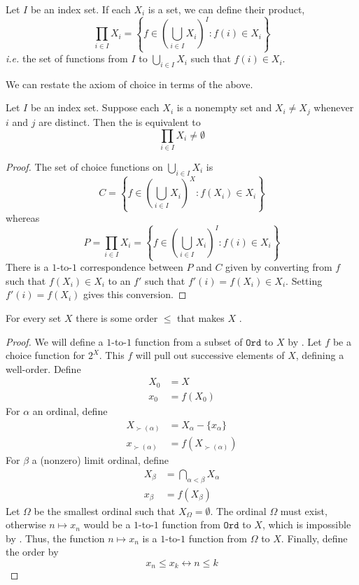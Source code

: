 \documentclass{scrbook}
\renewcommand{\iff}{\leftrightarrow}
\newcommand{\ie}{\emph{i.e.}\xspace}
\newcommand{\ord}{\mathtt{Ord}}
\begin{document}
\begin{defn}
  Let $I$ be an index set. If each $X_i$ is a set, we can define their product,
  \[
  \prod_{i\in I} X_i=\left\{f\in\left(\bigcup_{i\in I} X_i\right)^I: f(i)\in X_i\right\}
  \]
  \ie the set of functions from $I$ to $\bigcup_{i\in I} X_i$ such that $f(i)\in X_i$. 
\end{defn}
We can restate the axiom of choice in terms of the above.
\begin{theorem}
  Let $I$ be an index set. Suppose each $X_i$ is a nonempty set and $X_i\neq X_j$ whenever $i$ and $j$ are distinct. Then the  is equivalent to
  \begin{equation}
    \prod_{i\in I} X_i\neq \emptyset
    \label{eq:nonempty-prod}
  \end{equation}
\end{theorem}
\begin{proof}
The set of choice functions on $\bigcup_{i\in I} X_i$ is 
  \[
  C=\left\{f\in \left(\bigcup_{i\in I} X_i\right)^X: f(X_i)\in X_i\right\}
  \]
  whereas
  \[
  P=\prod_{i\in I} X_i = \left\{f\in\left(\bigcup_{i\in I} X_i\right)^I: f(i) \in X_i\right\}
  \]
  There is a $1$-to-$1$ correspondence between $P$ and $C$ given by converting from $f$ such that $f(X_i)\in X_i$ to an $f'$ such that $f'(i)=f(X_i)\in X_i$. Setting $f'(i)=f(X_i)$ gives this conversion.
\end{proof}

\begin{theorem}\label{th:well-ordering}
  For every set $X$ there is some order $\leq$ that makes $X$ . 
\end{theorem}
\begin{proof}
  We will define a $1$-to-$1$ function from a subset of $\ord$ to $X$ by . Let $f$ be a choice function for $2^X$. This $f$ will pull out successive elements of $X$,  defining a well-order. Define
  \begin{align*}
    X_0 &= X \\
    x_0 &= f(X_0)
  \end{align*}
  For $\alpha$ an ordinal, define 
  \begin{align*}
    X_{\succ(\alpha)} &= X_\alpha-\{x_\alpha\} \\
    x_{\succ(\alpha)} &= f(X_{\succ(\alpha)})
  \end{align*}
  For $\beta$ a (nonzero) limit ordinal, define 
  \begin{align*}
    X_\beta &= \bigcap_{\alpha < \beta} X_\alpha \\
    x_\beta &=f(X_\beta)
  \end{align*}
  Let $\Omega$ be the smallest ordinal such that $X_\Omega=\emptyset$. The ordinal $\Omega$ must exist, otherwise $n\mapsto x_n$ would be a $1$-to-$1$ function from $\ord$ to $X$, which is impossible by . Thus, the function $n\mapsto x_n$ is a $1$-to-$1$ function from $\Omega$ to $X$. Finally, define the order by 
  \[
  x_n \leq x_k \iff n \leq k
  \]
\end{proof}
\end{document}
